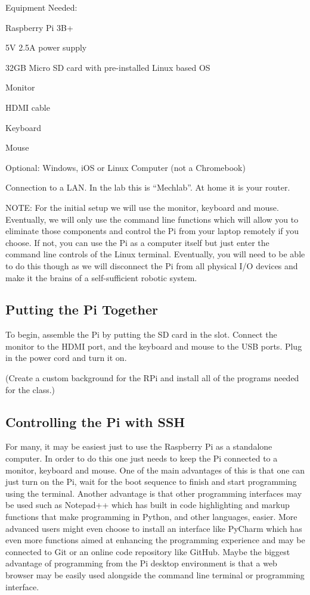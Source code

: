 \documentclass[
]{book}
\begin{document}
Equipment Needed:

Raspberry Pi 3B+

5V \textbar{} 2.5A power supply

32GB Micro SD card with pre-installed Linux based OS

Monitor

HDMI cable

Keyboard

Mouse

Optional: Windows, iOS or Linux Computer (not a Chromebook)

Connection to a LAN. In the lab this is ``Mechlab''. At home it is your router.

NOTE: For the initial setup we will use the monitor, keyboard and mouse. Eventually, we will only use the command line functions which will allow you to eliminate those components and control the Pi from your laptop remotely if you choose. If not, you can use the Pi as a computer itself but just enter the command line controls of the Linux terminal. Eventually, you will need to be able to do this though as we will disconnect the Pi from all physical I/O devices and make it the brains of a self-sufficient robotic system.

\hypertarget{putting-the-pi-together}{%
\subsection{Putting the Pi Together}\label{putting-the-pi-together}}

To begin, assemble the Pi by putting the SD card in the slot. Connect the monitor to the HDMI port, and the keyboard and mouse to the USB ports. Plug in the power cord and turn it on.

(Create a custom background for the RPi and install all of the programs needed for the class.)

\hypertarget{controlling-the-pi-with-ssh}{%
\subsection{Controlling the Pi with SSH}\label{controlling-the-pi-with-ssh}}

For many, it may be easiest just to use the Raspberry Pi as a standalone computer. In order to do this one just needs to keep the Pi connected to a monitor, keyboard and mouse. One of the main advantages of this is that one can just turn on the Pi, wait for the boot sequence to finish and start programming using the terminal. Another advantage is that other programming interfaces may be used such as Notepad++ which has built in code highlighting and markup functions that make programming in Python, and other languages, easier. More advanced users might even choose to install an interface like PyCharm which has even more functions aimed at enhancing the programming experience and may be connected to Git or an online code repository like GitHub. Maybe the biggest advantage of programming from the Pi desktop environment is that a web browser may be easily used alongside the command line terminal or programming interface.
\end{document}
